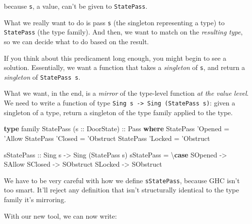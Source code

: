 \documentclass[]{article}
\newenvironment{Shaded}{}{}
\newcommand{\DataTypeTok}[1]{\textcolor[rgb]{0.56,0.13,0.00}{#1}}
\newcommand{\FunctionTok}[1]{\textcolor[rgb]{0.02,0.16,0.49}{#1}}
\newcommand{\KeywordTok}[1]{\textcolor[rgb]{0.00,0.44,0.13}{\textbf{#1}}}
\newcommand{\NormalTok}[1]{#1}
\newcommand{\OtherTok}[1]{\textcolor[rgb]{0.00,0.44,0.13}{#1}}
\begin{document}
because \texttt{s}, a value, can't be given to \texttt{StatePass}.

What we really want to do is pass \texttt{s} (the singleton representing a type)
to \texttt{StatePass} (the type family). And then, we want to match on the
\emph{resulting type}, so we can decide what to do based on the result.

If you think about this predicament long enough, you might begin to see a
solution. Essentially, we want a function that takes a \emph{singleton} of
\texttt{s}, and return a \emph{singleton} of \texttt{StatePass\ s}.

What we want, in the end, is a \emph{mirror} of the type-level function \emph{at
the value level}. We need to write a function of type
\texttt{Sing\ s\ -\textgreater{}\ Sing\ (StatePass\ s)}: given a singleton of a
type, return a singleton of the type family applied to the type.

\begin{Shaded}
\begin{Highlighting}[]
\KeywordTok{type}\NormalTok{ family }\DataTypeTok{StatePass}\NormalTok{ (}\OtherTok{s ::} \DataTypeTok{DoorState}\NormalTok{)}\OtherTok{ ::} \DataTypeTok{Pass} \KeywordTok{where}
    \DataTypeTok{StatePass}\NormalTok{ '}\DataTypeTok{Opened} \FunctionTok{=}\NormalTok{ '}\DataTypeTok{Allow}
    \DataTypeTok{StatePass}\NormalTok{ '}\DataTypeTok{Closed} \FunctionTok{=}\NormalTok{ '}\DataTypeTok{Obstruct}
    \DataTypeTok{StatePass}\NormalTok{ '}\DataTypeTok{Locked} \FunctionTok{=}\NormalTok{ '}\DataTypeTok{Obstruct}

\OtherTok{sStatePass ::} \DataTypeTok{Sing}\NormalTok{ s }\OtherTok{->} \DataTypeTok{Sing}\NormalTok{ (}\DataTypeTok{StatePass}\NormalTok{ s)}
\NormalTok{sStatePass }\FunctionTok{=}\NormalTok{ \textbackslash{}}\KeywordTok{case}
    \DataTypeTok{SOpened} \OtherTok{->} \DataTypeTok{SAllow}
    \DataTypeTok{SClosed} \OtherTok{->} \DataTypeTok{SObstruct}
    \DataTypeTok{SLocked} \OtherTok{->} \DataTypeTok{SObstruct}
\end{Highlighting}
\end{Shaded}

We have to be very careful with how we define \texttt{sStatePass}, because GHC
isn't too smart. It'll reject any definition that isn't structurally identical
to the type family it's mirroring.

With our new tool, we can now write:
\end{document}
